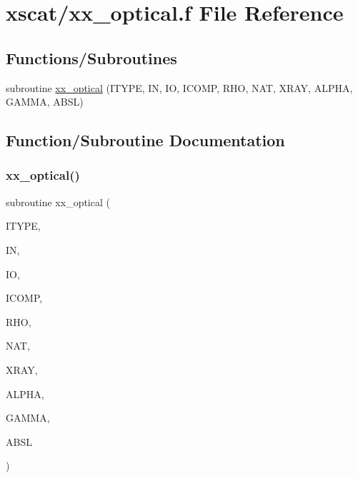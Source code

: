 \hypertarget{xx__optical_8f}{}\section{xscat/xx\+\_\+optical.f File Reference}
\label{xx__optical_8f}
\subsection*{Functions/\+Subroutines}
\begin{DoxyCompactItemize}
\item 
subroutine \hyperlink{xx__optical_8f_a7367f3555f57755bc2b78c6cdc3abea2}{xx\+\_\+optical} (I\+T\+Y\+PE, IN, IO, I\+C\+O\+MP, R\+HO, N\+AT, X\+R\+AY, A\+L\+P\+HA, G\+A\+M\+MA, A\+B\+SL)
\end{DoxyCompactItemize}


\subsection{Function/\+Subroutine Documentation}
\mbox{\label{xx__optical_8f_a7367f3555f57755bc2b78c6cdc3abea2}} 
\subsubsection{\texorpdfstring{xx\+\_\+optical()}{xx\_optical()}}
{\footnotesize\ttfamily subroutine xx\+\_\+optical (\begin{DoxyParamCaption}\item[{integer}]{I\+T\+Y\+PE,  }\item[{integer}]{IN,  }\item[{integer}]{IO,  }\item[{integer, dimension(nat)}]{I\+C\+O\+MP,  }\item[{}]{R\+HO,  }\item[{integer}]{N\+AT,  }\item[{}]{X\+R\+AY,  }\item[{}]{A\+L\+P\+HA,  }\item[{}]{G\+A\+M\+MA,  }\item[{}]{A\+B\+SL }\end{DoxyParamCaption})}

